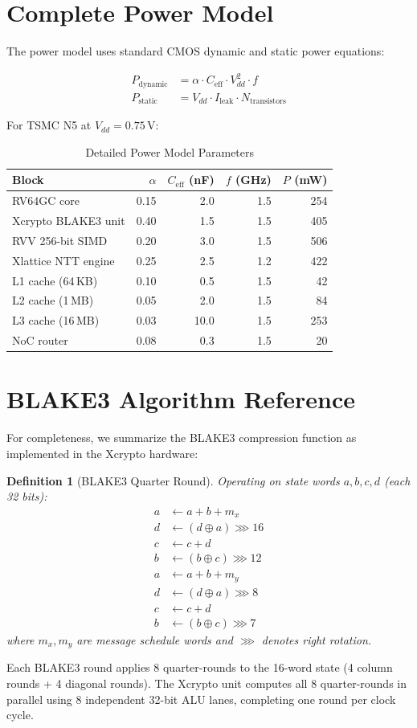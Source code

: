 \documentclass[11pt,a4paper]{article}
\newtheorem{definition}[theorem]{Definition}
\begin{document}
\section{Complete Power Model}
\label{app:power}

The power model uses standard CMOS dynamic and static power equations:

\begin{align}
    P_{\text{dynamic}} &= \alpha \cdot C_{\text{eff}} \cdot V_{dd}^2 \cdot f \\
    P_{\text{static}} &= V_{dd} \cdot I_{\text{leak}} \cdot N_{\text{transistors}}
\end{align}

For TSMC N5 at $V_{dd} = 0.75$\,V:

\begin{table}[H]
\centering
\caption{Detailed Power Model Parameters}
\small
\begin{tabular}{@{}lrrrr@{}}
\toprule
\textbf{Block} & $\alpha$ & $C_{\text{eff}}$ (nF) & $f$ (GHz) & $P$ (mW) \\
\midrule
RV64GC core & 0.15 & 2.0 & 1.5 & 254 \\
Xcrypto BLAKE3 unit & 0.40 & 1.5 & 1.5 & 405 \\
RVV 256-bit SIMD & 0.20 & 3.0 & 1.5 & 506 \\
Xlattice NTT engine & 0.25 & 2.5 & 1.2 & 422 \\
L1 cache (64\,KB) & 0.10 & 0.5 & 1.5 & 42 \\
L2 cache (1\,MB) & 0.05 & 2.0 & 1.5 & 84 \\
L3 cache (16\,MB) & 0.03 & 10.0 & 1.5 & 253 \\
NoC router & 0.08 & 0.3 & 1.5 & 20 \\
\bottomrule
\end{tabular}
\end{table}

\section{BLAKE3 Algorithm Reference}
\label{app:blake3}

For completeness, we summarize the BLAKE3 compression function as implemented in the Xcrypto hardware:

\begin{definition}[BLAKE3 Quarter Round]
Operating on state words $a, b, c, d$ (each 32 bits):
\begin{align}
    a &\leftarrow a + b + m_x \\
    d &\leftarrow (d \oplus a) \ggg 16 \\
    c &\leftarrow c + d \\
    b &\leftarrow (b \oplus c) \ggg 12 \\
    a &\leftarrow a + b + m_y \\
    d &\leftarrow (d \oplus a) \ggg 8 \\
    c &\leftarrow c + d \\
    b &\leftarrow (b \oplus c) \ggg 7
\end{align}
where $m_x, m_y$ are message schedule words and $\ggg$ denotes right rotation.
\end{definition}

Each BLAKE3 round applies 8 quarter-rounds to the 16-word state (4 column rounds + 4 diagonal rounds). The Xcrypto unit computes all 8 quarter-rounds in parallel using 8 independent 32-bit ALU lanes, completing one round per clock cycle.
\end{document}
